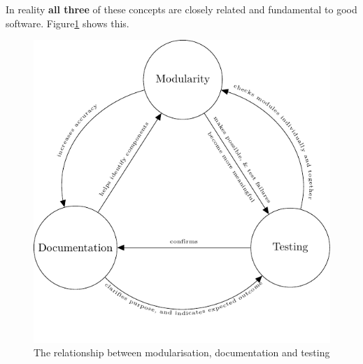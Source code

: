 In reality \textbf{all three} of these concepts are closely related and fundamental to
good software. Figure\ref{fig:best_practice_triangle} shows this.

\begin{figure}[!htbp]
\centering

\includegraphics[width=0.750\linewidth]{./assets/best_practice_triangle/main.pdf}
\caption{The relationship between modularisation, documentation and testing}
\label{fig:best_practice_triangle}
\end{figure}
